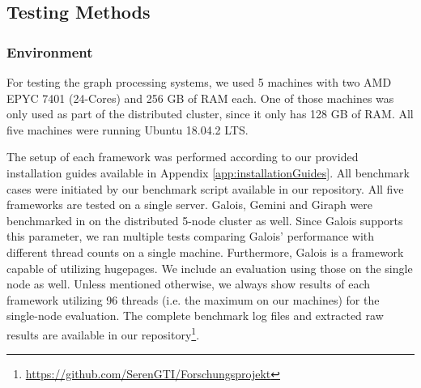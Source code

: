 

\subsection{Testing Methods}

\subsubsection{Environment}
For testing the graph processing systems, we used 5 machines with two AMD EPYC 7401 (24-Cores) and 256 GB of RAM each. One of those machines was only used as part of the distributed cluster, since it only has 128 GB of RAM.
All five machines were running Ubuntu 18.04.2 LTS.

The setup of each framework was performed according to our provided installation guides available in Appendix \ref{app:installationGuides}.
All benchmark cases were initiated by our benchmark script available in our repository.
All five frameworks are tested on a single server.
Galois, Gemini and Giraph were benchmarked in on the distributed 5-node cluster as well.
Since Galois supports this parameter, we ran multiple tests comparing Galois' performance with different thread counts on a single machine.
Furthermore, Galois is a framework capable of utilizing hugepages. We include an evaluation using those on the single node as well.
Unless mentioned otherwise, we always show results of each framework utilizing 96 threads (i.e. the maximum on our machines) for the single-node evaluation.
The complete benchmark log files and extracted raw results are available in our repository\footnote{\url{https://github.com/SerenGTI/Forschungsprojekt}}.


